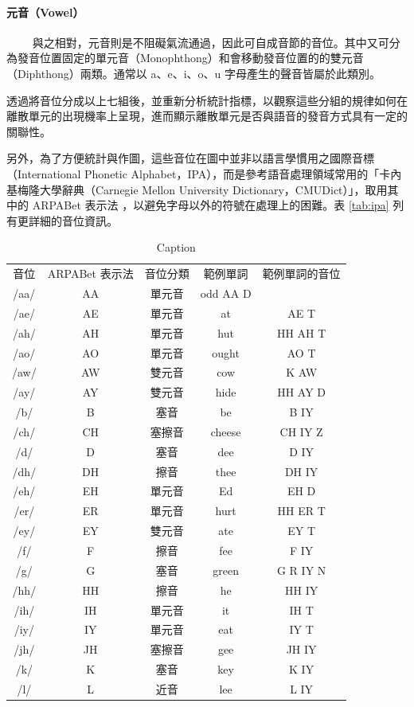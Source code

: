 {\paragraph{元音（Vowel）} \hfill \break
%
　　
與之相對，元音則是不阻礙氣流通過，因此可自成音節的音位。其中又可分為發音位置固定的單元音（Monophthong）和會移動發音位置的的雙元音（Diphthong）兩類。通常以 a、e、i、o、u 字母產生的聲音皆屬於此類別。


        
        透過將音位分成以上七組後，並重新分析統計指標，以觀察這些分組的規律如何在離散單元的出現機率上呈現，進而顯示離散單元是否與語音的發音方式具有一定的關聯性。

另外，為了方便統計與作圖，這些音位在圖中並非以語言學慣用之國際音標（International Phonetic Alphabet，IPA），而是參考語音處理領域常用的「卡內基梅隆大學辭典（Carnegie Mellon University Dictionary，CMUDict）」，取用其中的 ARPABet 表示法 ，以避免字母以外的符號在處理上的困難。表 \ref{tab:ipa} 列有更詳細的音位資訊。


\begin{table}
    \centering
    \begin{tabular}{ccccc}
        音位 & ARPABet 表示法 & 音位分類 & 範例單詞 & 範例單詞的音位\\
/aa/ & AA & 單元音 & odd     AA D \\
/ae/ & AE & 單元音 & at & AE T \\
/ah/ & AH & 單元音 & hut &     HH AH T \\
/ao/ & AO & 單元音 & ought &   AO T \\
/aw/ & AW & 雙元音 & cow &     K AW \\
/ay/ & AY & 雙元音 & hide &    HH AY D \\
/b/  & B  & 塞音 & be & B IY \\
/ch/ & CH & 塞擦音 & cheese &  CH IY Z \\
/d/  & D  & 塞音 & dee &     D IY \\
/dh/ & DH & 擦音 & thee &    DH IY \\
/eh/ & EH & 單元音 & Ed & EH D \\
/er/ & ER & 單元音 & hurt &    HH ER T \\
/ey/ & EY & 雙元音 & ate &     EY T \\
/f/  & F  & 擦音 & fee &     F IY \\
/g/  & G  & 塞音 & green &   G R IY N \\
/hh/ & HH & 擦音 & he & HH IY \\
/ih/ & IH & 單元音 & it & IH T \\
/iy/ & IY & 單元音 & eat &     IY T \\
/jh/ & JH & 塞擦音 & gee &     JH IY \\
/k/  & K  & 塞音 & key &     K IY \\
/l/  & L  & 近音 & lee &     L IY \\
    \end{tabular}
    \caption{Caption}
    \label{tab:ipa1}
\end{table}

}
